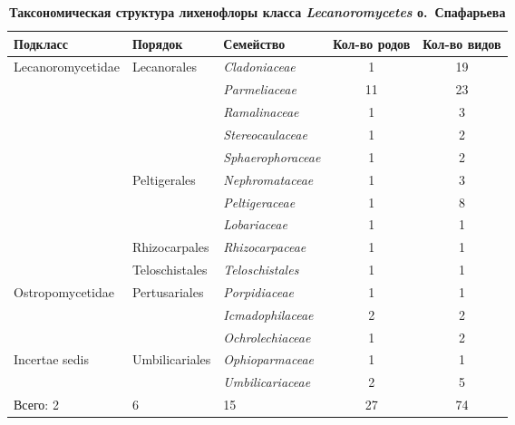 \begin{table}[h!]
\caption*{\textbf{Таксономическая структура лихенофлоры класса \textit{Lecanoromycetes} о.~Спафарьева}}
\label{tab:zhelydeva}
\begin{tabular}{lllcc}
   \toprule
Подкласс          & Порядок                  & Семейство                 &  \parbox[c][4em][c]{0.1\textwidth}{ \centering Кол-во родов} & \parbox[c][4em][c]{0.1\textwidth}{ \centering Кол-во видов} \\
 \midrule
Lecanoromycetidae & Lecanorales              & \textit{Cladoniaceae}     & 1                & 19               \\
                  &                          & \textit{Parmeliaceae}    & 11                & 23               \\
                  &                          & \textit{Ramalinaceae}     & 1                & 3                \\
                  &                          & \textit{Stereocaulaceae}  & 1                & 2                \\
                  &                          & \textit{Sphaerophoraceae} & 1                & 2                \\
                  & Peltigerales             & \textit{Nephromataceae}   & 1                & 3                \\
                  &                          & \textit{Peltigeraceae}    & 1                & 8                \\
                  &                          & \textit{Lobariaceae}      & 1                & 1                \\
                  & Rhizocarpales            & \textit{Rhizocarpaceae}   & 1                & 1                \\
                  & Teloschistales           & \textit{Teloschistales}   & 1                & 1                \\
 \midrule
Ostropomycetidae  & Pertusariales            & \textit{Porpidiaceae}     & 1                & 1                \\
                  &                          & \textit{Icmadophilaceae}  & 2                 & 2                \\
                  &                          & \textit{Ochrolechiaceae}  & 1                & 2                \\
 \midrule
Incertae sedis    & Umbilicariales           & \textit{Ophioparmaceae}   & 1                & 1                \\
                  &                          & \textit{Umbilicariaceae}  & 2                & 5                \\
 \midrule
Всего: 2          & 6                        & 15                        & 27               & 74\\
\bottomrule

\end{tabular}
\end{table}
